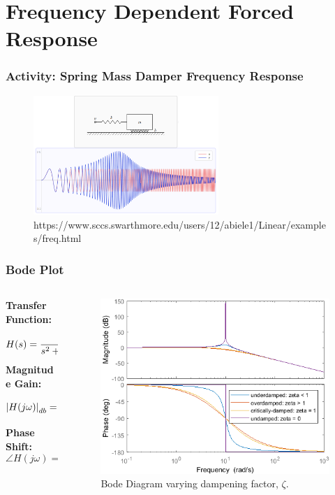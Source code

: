 \documentclass[aspectratio=169]{beamer}
\begin{document}
\section{Frequency Dependent Forced Response}
\begin{frame}
	\frametitle{Activity: Spring Mass Damper Frequency Response
	\cite{swarthmore_freq_response}}
	\begin{figure}
		\includegraphics[width=0.625\textwidth]{Images/visualize_varied_freq_response.png}
		https://www.sccs.swarthmore.edu/users/12/abiele1/Linear/examples/freq.html
	\end{figure}
\end{frame}

\begin{frame}
	\frametitle{Bode Plot}
	\begin{columns}
		\begin{column}{0.375\textwidth}
			\textbf{Transfer Function:}
			\[
				H(s) 
				= \cfrac{
					\omega_0^2
				}{
					s^2 + 2 \zeta \omega_0 s + \omega_0^2
				}
			\]
			\textbf{Magnitude Gain:} 
			\[\abs{H(j\omega)}_{db} = 20 \log_{10} \abs{\frac{Y_0}{U_0}}\]
			\textbf{Phase Shift:}
			\[\angle{H(j\omega)} = \phi\]
		\end{column}
		\begin{column}{0.5\textwidth}
			\begin{figure}
				\includegraphics[width=\textwidth]{Images/bode_diagram.png}
				Bode Diagram varying dampening factor, $\zeta$.
			\end{figure}
		\end{column}
	\end{columns}
\end{frame}	
\end{document}
